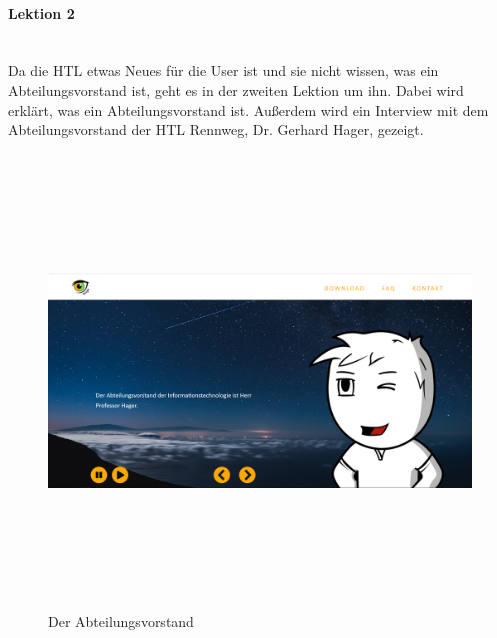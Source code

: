 \paragraph{Lektion 2} \leavevmode \\
Da die HTL etwas Neues für die User ist und sie nicht wissen, was ein Abteilungsvorstand ist, geht es in der zweiten Lektion um ihn. Dabei wird erklärt, was ein Abteilungsvorstand ist. Außerdem wird ein Interview mit dem Abteilungsvorstand der HTL Rennweg, Dr. Gerhard Hager, gezeigt. 
\begin{figure} [h]
	\centering
\includegraphics[width=12cm,height=12cm,keepaspectratio]{webseite_abb13} 
	\caption{Der Abteilungsvorstand}
\end{figure}
